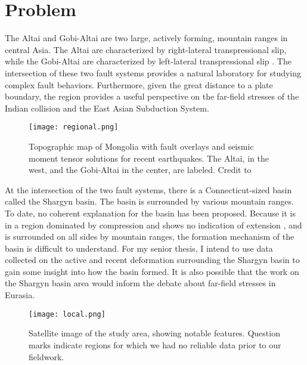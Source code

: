 \documentclass[10pt,a4paper]{article}
\begin{document}
\section*{Problem}
	The Altai and Gobi-Altai are two large, actively forming, mountain ranges in central Asia. The Altai are characterized by right-lateral transpressional slip, while the Gobi-Altai are characterized by left-lateral transpressional slip \citep{Cunningham2005a}. The intersection of these two fault systems provides a natural laboratory for studying complex fault behaviors. Furthermore, given the great distance to a plate boundary, the region provides a useful perspective on the far-field stresses of the Indian collision and the East Asian Subduction System. 

\begin{figure}[h!]
  \centering
  \texttt{[image: regional.png]}
  \caption{Topographic map of Mongolia with fault overlays and seismic moment tensor solutions for recent earthquakes. The Altai, in the west, and the Gobi-Altai in the center, are labeled. Credit to \citep{Calais2003}}
\end{figure}

	At the intersection of the two fault systems, there is a Connecticut-sized basin called the Shargyn basin. The basin is surrounded by various mountain ranges. To date, no coherent explanation for the basin has been proposed. Because it is in a region dominated by compression and shows no indication of extension \citep{Cunningham2005a}, and is surrounded on all sides by mountain ranges, the formation mechanism of the basin is difficult to understand. For my senior thesis, I intend to use data collected on the active and recent deformation surrounding the Shargyn basin to gain some insight into how the basin formed. It is also possible that the work on the Shargyn basin area would inform the debate about far-field stresses in Eurasia.
	
\begin{figure}[h!]
	\centering
	\texttt{[image: local.png]}
	\caption{Satellite image of the study area, showing notable features. Question marks indicate regions for which we had no reliable data prior to our fieldwork.}
\end{figure}
	
\end{document}
